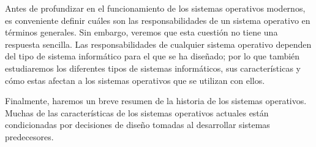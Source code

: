 Antes de profundizar en el funcionamiento de los sistemas operativos
modernos, es conveniente definir cuáles son las responsabilidades de un
sistema operativo en términos generales. Sin embargo, veremos que esta
cuestión no tiene una respuesta sencilla. Las responsabilidades de
cualquier sistema operativo dependen del tipo de sistema informático
para el que se ha diseñado; por lo que también estudiaremos los
diferentes tipos de sistemas informáticos, sus características y cómo
estas afectan a los sistemas operativos que se utilizan con ellos.

Finalmente, haremos un breve resumen de la historia de los sistemas
operativos. Muchas de las características de los sistemas operativos
actuales están condicionadas por decisiones de diseño tomadas al
desarrollar sistemas predecesores.
